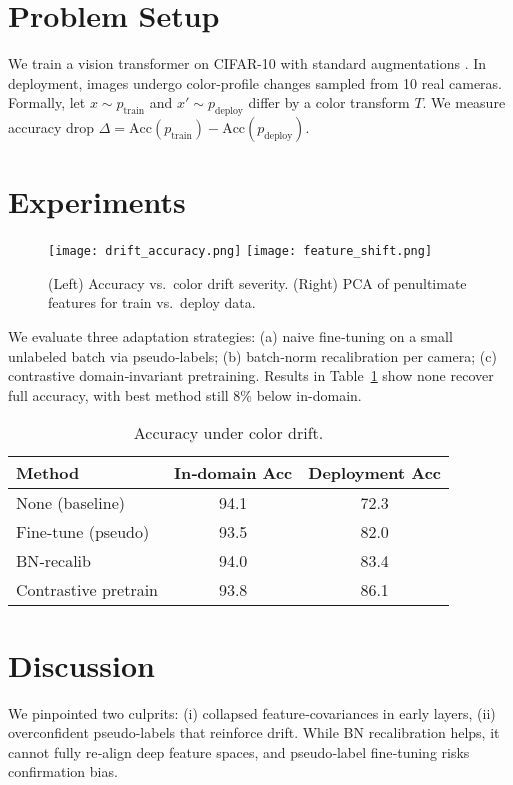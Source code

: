 
\section{Problem Setup}
We train a vision transformer on CIFAR-10 with standard augmentations \citep{Krizhevsky2009}. In deployment, images undergo color-profile changes sampled from 10 real cameras. Formally, let $x\sim p_\text{train}$ and $x'\sim p_\text{deploy}$ differ by a color transform $T$. We measure accuracy drop $\Delta = \mathrm{Acc}(p_\text{train}) - \mathrm{Acc}(p_\text{deploy})$.

\section{Experiments}
\begin{figure}[t]
  \centering
  \texttt{[image: drift\_accuracy.png]}
  \texttt{[image: feature\_shift.png]}
  \caption{(Left) Accuracy vs.\ color drift severity. (Right) PCA of penultimate features for train vs.\ deploy data.}
  \label{fig:drift}
\end{figure}

We evaluate three adaptation strategies: (a) naive fine‐tuning on a small unlabeled batch via pseudo‐labels; (b) batch‐norm recalibration per camera; (c) contrastive domain‐invariant pretraining. Results in Table~\ref{tab:results} show none recover full accuracy, with best method still 8\% below in-domain.

\begin{table}[t]
\centering\footnotesize
\begin{tabular}{lcc}
\toprule
Method & In‐domain Acc & Deployment Acc \\
\midrule
None (baseline) & 94.1 & 72.3 \\
Fine-tune (pseudo) & 93.5 & 82.0 \\
BN‐recalib & 94.0 & 83.4 \\
Contrastive pretrain & 93.8 & 86.1 \\
\bottomrule
\end{tabular}
\caption{Accuracy under color drift.}
\label{tab:results}
\end{table}

\section{Discussion}
We pinpointed two culprits: (i) collapsed feature‐covariances in early layers, (ii) overconfident pseudo-labels that reinforce drift. While BN recalibration helps, it cannot fully re‐align deep feature spaces, and pseudo‐label fine‐tuning risks confirmation bias.

